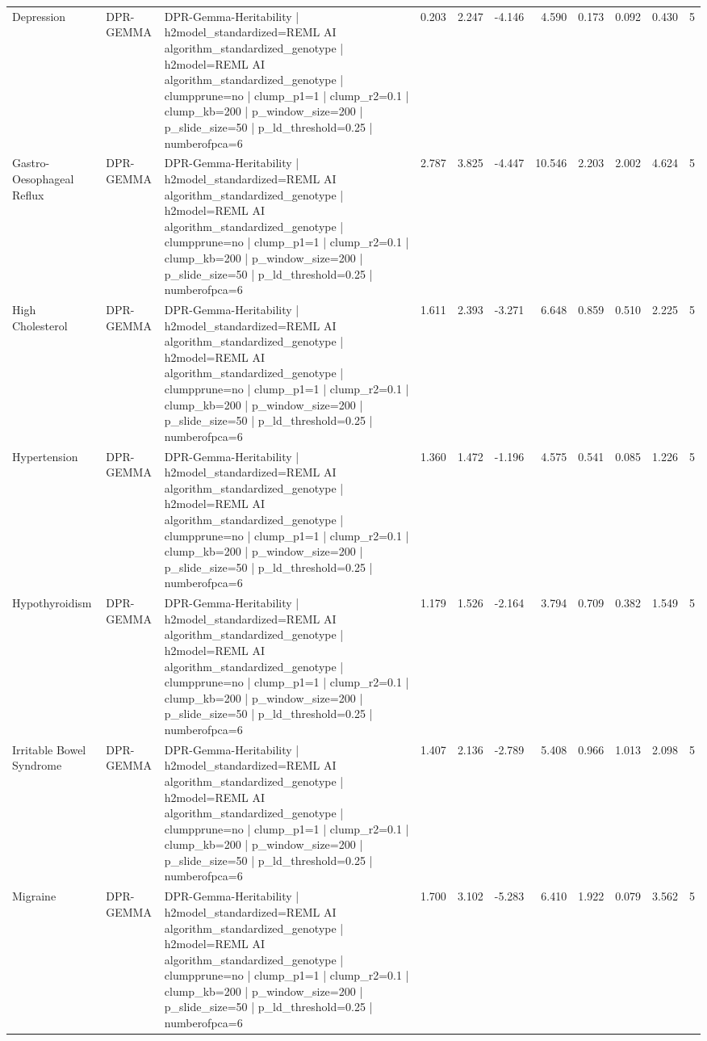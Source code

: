 \begin{landscape}
\begin{longtable}{p{2.4cm}p{1.8cm}p{6.0cm}rrrrrrrr}
Depression & DPR-GEMMA & DPR-Gemma-Heritability | h2model\_standardized=REML AI algorithm\_standardized\_genotype | h2model=REML AI algorithm\_standardized\_genotype | clumpprune=no | clump\_p1=1 | clump\_r2=0.1 | clump\_kb=200 | p\_window\_size=200 | p\_slide\_size=50 | p\_ld\_threshold=0.25 | numberofpca=6 & 0.203 & 2.247 & -4.146 & 4.590 & 0.173 & 0.092 & 0.430 & 5 \\
Gastro-Oesophageal Reflux & DPR-GEMMA & DPR-Gemma-Heritability | h2model\_standardized=REML AI algorithm\_standardized\_genotype | h2model=REML AI algorithm\_standardized\_genotype | clumpprune=no | clump\_p1=1 | clump\_r2=0.1 | clump\_kb=200 | p\_window\_size=200 | p\_slide\_size=50 | p\_ld\_threshold=0.25 | numberofpca=6 & 2.787 & 3.825 & -4.447 & 10.546 & 2.203 & 2.002 & 4.624 & 5 \\
High Cholesterol & DPR-GEMMA & DPR-Gemma-Heritability | h2model\_standardized=REML AI algorithm\_standardized\_genotype | h2model=REML AI algorithm\_standardized\_genotype | clumpprune=no | clump\_p1=1 | clump\_r2=0.1 | clump\_kb=200 | p\_window\_size=200 | p\_slide\_size=50 | p\_ld\_threshold=0.25 | numberofpca=6 & 1.611 & 2.393 & -3.271 & 6.648 & 0.859 & 0.510 & 2.225 & 5 \\
Hypertension & DPR-GEMMA & DPR-Gemma-Heritability | h2model\_standardized=REML AI algorithm\_standardized\_genotype | h2model=REML AI algorithm\_standardized\_genotype | clumpprune=no | clump\_p1=1 | clump\_r2=0.1 | clump\_kb=200 | p\_window\_size=200 | p\_slide\_size=50 | p\_ld\_threshold=0.25 | numberofpca=6 & 1.360 & 1.472 & -1.196 & 4.575 & 0.541 & 0.085 & 1.226 & 5 \\
Hypothyroidism & DPR-GEMMA & DPR-Gemma-Heritability | h2model\_standardized=REML AI algorithm\_standardized\_genotype | h2model=REML AI algorithm\_standardized\_genotype | clumpprune=no | clump\_p1=1 | clump\_r2=0.1 | clump\_kb=200 | p\_window\_size=200 | p\_slide\_size=50 | p\_ld\_threshold=0.25 | numberofpca=6 & 1.179 & 1.526 & -2.164 & 3.794 & 0.709 & 0.382 & 1.549 & 5 \\
Irritable Bowel Syndrome & DPR-GEMMA & DPR-Gemma-Heritability | h2model\_standardized=REML AI algorithm\_standardized\_genotype | h2model=REML AI algorithm\_standardized\_genotype | clumpprune=no | clump\_p1=1 | clump\_r2=0.1 | clump\_kb=200 | p\_window\_size=200 | p\_slide\_size=50 | p\_ld\_threshold=0.25 | numberofpca=6 & 1.407 & 2.136 & -2.789 & 5.408 & 0.966 & 1.013 & 2.098 & 5 \\
Migraine & DPR-GEMMA & DPR-Gemma-Heritability | h2model\_standardized=REML AI algorithm\_standardized\_genotype | h2model=REML AI algorithm\_standardized\_genotype | clumpprune=no | clump\_p1=1 | clump\_r2=0.1 | clump\_kb=200 | p\_window\_size=200 | p\_slide\_size=50 | p\_ld\_threshold=0.25 | numberofpca=6 & 1.700 & 3.102 & -5.283 & 6.410 & 1.922 & 0.079 & 3.562 & 5 \\

\end{longtable}
\end{landscape}
